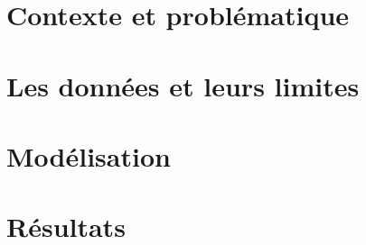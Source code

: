 \documentclass[11pt,a4paper]{report}
\begin{document}





\part{Contexte et problématique}
\label{part:contexte}

\part{Les données et leurs limites}
\label{part:donnees}

\part{Modélisation}
\label{part:modele}

\part{Résultats}
\label{part:resultats}
\end{document}
